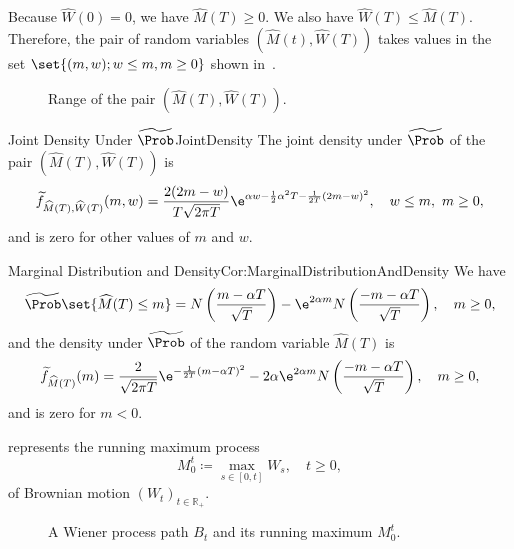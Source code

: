 Because \(\widehat{W}(0) = 0\), we have \(\widehat{M}(T) \ge 0\). We also have \(\widehat{W}(T) \le \widehat{M}(T)\). Therefore, the pair of random variables \((\widehat{M}(t), \widehat{W}(T))\) takes values in the set \(\set{(m, w); w \le m, m \ge 0}\) shown in~.

\begin{figure}[H]
	\centering
	
	\caption{Range of the pair \((\widehat{M}(T), \widehat{W}(T))\).}
	\label{fig:RangeOfMW}
\end{figure}

\begin{thm}{Joint Density Under \(\widetilde{\Prob}\)}{JointDensity}
	The joint density under \(\widetilde{\Prob}\) of the pair \((\widehat{M}(T), \widehat{W}(T))\) is
	\begin{equation} \label{eq:JointDensityFormula}
		\widetilde{f}_{\widehat{M}(T),\widehat{W}(T)}(m, w) = \frac{2(2m-w)}{T\sqrt{2\pi T}} \e^{\alpha w - \frac{1}{2}\alpha^2 T - \frac{1}{2T}(2m-w)^2} , \quad w \leq m, \ m \geq 0,
	\end{equation}
	and is zero for other values of \(m\) and \(w\).
\end{thm}

\begin{cor}{Marginal Distribution and Density}{Cor:MarginalDistributionAndDensity}
	We have
	\begin{equation} \label{eq:MarginalProbability}
		\widetilde{\Prob}\set{\widehat{M}(T) \leq m} = N \left( \frac{m - \alpha T}{\sqrt{T}} \right) - \e^{2\alpha m} N \left( \frac{-m - \alpha T}{\sqrt{T}} \right), \quad m \geq 0,
	\end{equation}
	and the density under \(\widetilde{\Prob}\) of the random variable \(\widehat{M}(T)\) is
	\begin{equation} \label{eq:MarginalDensity}
		\widetilde{f}_{\widehat{M}(T)}(m) = \frac{2}{\sqrt{2\pi T}} \e^{-\frac{1}{2T}(m-\alpha T)^2} - 2\alpha \e^{2\alpha m} N \left( \frac{-m - \alpha T}{\sqrt{T}} \right), \quad m \geq 0,
	\end{equation}
	and is zero for \(m < 0\).
\end{cor}

 represents the running maximum process
\begin{equation}
	M_0^t \coloneqq \max_{s \in [0,t]} W_s, \quad t \geq 0, \nonumber
\end{equation}
of Brownian motion \((W_t)_{t\in\mathbb{R}_{+}}\).
\begin{figure}[H]
	\centering
	
	\caption{A Wiener process path \(B_t\) and its running maximum \(M_0^t\).}
	\label{fig:runningMax}
\end{figure}

